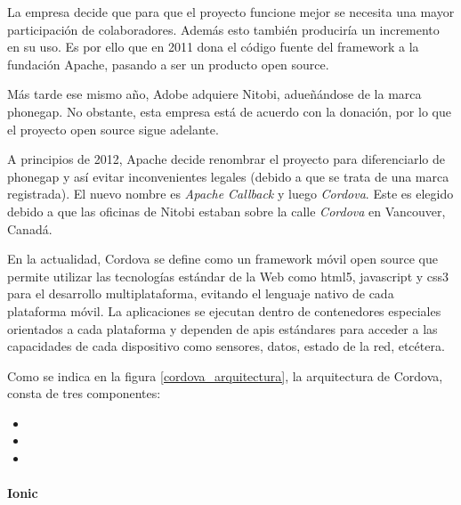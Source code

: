 La empresa decide que para que el proyecto funcione mejor se necesita una mayor participación de colaboradores. Además esto también produciría un incremento en su uso. Es por ello que en 2011 dona el código fuente del \gls{framework} a la fundación Apache, pasando a ser un producto \gls{open source}.

Más tarde ese mismo año, Adobe adquiere Nitobi, adueñándose de la marca \gls{phonegap}. No obstante, esta empresa está de acuerdo con la donación, por lo que el proyecto \gls{open source} sigue adelante.

A principios de 2012, Apache decide renombrar el proyecto para diferenciarlo de \gls{phonegap} y así evitar inconvenientes legales (debido a que se trata de una marca registrada). El nuevo nombre es \textit{Apache Callback} y luego \textit{Cordova}. Este es elegido debido a que las oficinas de Nitobi estaban sobre la calle \textit{Cordova} en Vancouver, Canadá.

En la actualidad, Cordova se define como un \gls{framework} móvil \gls{open source} que permite utilizar las tecnologías estándar de la Web como \gls{html}5, \gls{javascript} y \gls{css}3 para el desarrollo multiplataforma, evitando el lenguaje nativo de cada plataforma móvil. La aplicaciones se ejecutan dentro de contenedores especiales orientados a cada plataforma y dependen de \glspl{api} estándares para acceder a las capacidades de cada dispositivo como sensores, datos, estado de la red, etcétera.\cite{apache2017cordovaOverview}

Como se indica en la figura \ref{cordova_arquitectura}, la arquitectura de Cordova, consta de tres componentes:
\begin{itemize}
\item 
\item 
\item 
\end{itemize}

\paragraph{Ionic}
\label{ionic}